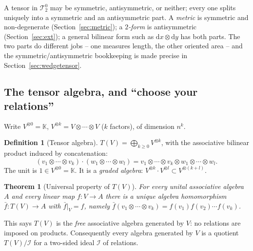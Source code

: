 \documentclass[11pt,a4paper]{article}
\newcounter{thm}[section]
\numberwithin{equation}{section}
\theoremstyle{definition}
\newtheorem{definition}[thm]{Definition}
\theoremstyle{plain}
\newtheorem{theorem}[thm]{Theorem}
\newcommand{\K}{\mathbb{K}}
\newcommand{\dd}{\mathrm{d}}
\newcommand{\TT}[2]{\mathcal{T}^{#1}_{#2}}          %
\begin{document}
\begin{remark}
A tensor in $\TT{0}{2}$ may be symmetric, antisymmetric, or neither; every one splits uniquely into a symmetric and an
antisymmetric part. A \emph{metric} is symmetric and non-degenerate (Section~\ref{sec:metric}); a \emph{$2$-form} is
antisymmetric (Section~\ref{sec:ext}); a general bilinear form such as $\dd x\otimes\dd y$ has both parts. The two parts
do different jobs -- one measures length, the other oriented area -- and the symmetric/antisymmetric bookkeeping
is made precise in Section~\ref{sec:wedgetensor}.
\end{remark}

\subsection{The tensor algebra, and ``choose your relations''}\label{sec:tensoralgebra}
Write $V^{\otimes 0}=\K$, $V^{\otimes k}=V\otimes\cdots\otimes V$ ($k$ factors), of dimension $n^k$.

\begin{definition}[Tensor algebra]
$T(V)=\bigoplus_{k\ge0}V^{\otimes k}$, with the associative bilinear product induced by concatenation:
\[
 (v_1\otimes\cdots\otimes v_k)\cdot(w_1\otimes\cdots\otimes w_l)=v_1\otimes\cdots\otimes v_k\otimes w_1\otimes\cdots\otimes w_l .
\]
The unit is $1\in V^{\otimes0}=\K$. It is a \emph{graded algebra}: $V^{\otimes k}\cdot V^{\otimes l}\subset V^{\otimes(k+l)}$.
\end{definition}

\begin{theorem}[Universal property of $T(V)$]\label{thm:Tuniv}
For every unital associative algebra $A$ and every linear map $f:V\to A$ there is a unique algebra homomorphism
$\bar f:T(V)\to A$ with $\bar f|_V=f$, namely $\bar f(v_1\otimes\cdots\otimes v_k)=f(v_1)f(v_2)\cdots f(v_k)$.
\end{theorem}

This says $T(V)$ is the \emph{free} associative algebra generated by $V$: no relations are imposed on products.
Consequently every algebra generated by $V$ is a quotient $T(V)/\mathcal I$ for a two-sided ideal $\mathcal I$ of relations.
\end{document}
